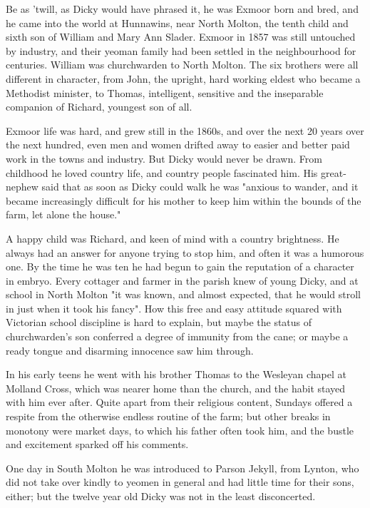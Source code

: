 \Flourish

Be as 'twill, as Dicky would have phrased it, he was Exmoor born and bred, and he came into the world at Hunnawins, near North Molton, the tenth child and sixth son of William and Mary Ann Slader. Exmoor in 1857 was still untouched by industry, and their yeoman family had been settled in the neighbourhood for centuries. William was churchwarden to North Molton. The six brothers were all different in character, from John, the upright, hard working eldest who became a Methodist minister, to Thomas, intelligent, sensitive and the inseparable companion of Richard, youngest son of all.

Exmoor life was hard, and grew still in the 1860s, and over the next 20 years   over the next hundred, even   men and women drifted away to easier and better paid work in the towns and industry. But Dicky would never be drawn. From childhood he loved country life, and country people fascinated him. His great-nephew said that as soon as Dicky could walk he was "anxious to wander, and it became increasingly difficult for his mother to keep him within the bounds of the farm, let alone the house."

A happy child was Richard, and keen of mind with a country brightness. He always had an answer for anyone trying to stop him, and often it was a humorous one. By the time he was ten he had begun to gain the reputation of a character in embryo. Every cottager and farmer in the parish knew of young Dicky, and at school in North Molton "it was known, and almost expected, that he would stroll in just when it took his fancy". How this free and easy attitude squared with Victorian school discipline is hard to explain, but maybe the status of churchwarden's son conferred a degree of immunity from the cane; or maybe a ready tongue and disarming innocence saw him through.

In his early teens he went with his brother Thomas to the Wesleyan chapel at Molland Cross, which was nearer home than the church, and the habit stayed with him ever after. Quite apart from their religious content, Sundays offered a respite from the otherwise endless routine of the farm; but other breaks in monotony were market days, to which his father often took him, and the bustle and excitement sparked off his comments.

One day in South Molton he was introduced to Parson Jekyll, from Lynton, who did not take over kindly to yeomen in general and had little time for their sons, either; but the twelve year old Dicky was not in the least disconcerted.

